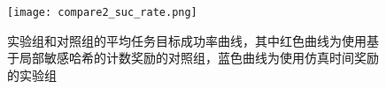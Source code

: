         \begin{figure}[htpb]
        \centering
        \texttt{[image: compare2\_suc\_rate.png]}
        \caption{实验组和对照组的平均任务目标成功率曲线，其中红色曲线为使用基于局部敏感哈希的计数奖励的对照组，蓝色曲线为使用仿真时间奖励的实验组}
            \label{cmp2suc_rate}
        \end{figure}


